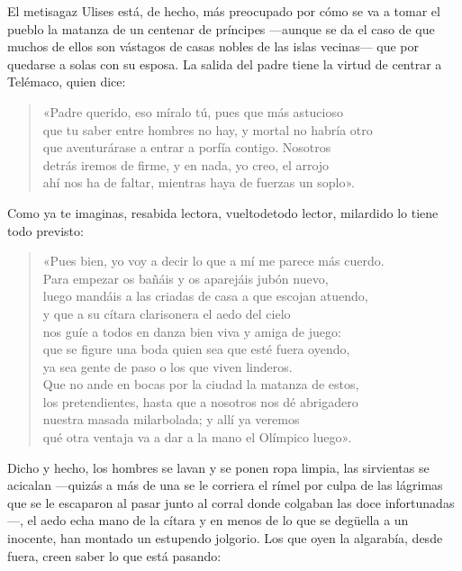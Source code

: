 El metisagaz Ulises está, de hecho, más preocupado por cómo se va a tomar el pueblo la matanza de un centenar de príncipes ---aunque se da el caso de que muchos de ellos son vástagos de casas nobles de las islas vecinas--- que por quedarse a solas con su esposa. La salida del padre tiene la virtud de centrar a Telémaco, quien dice:

\begin{verse}
«Padre querido, eso míralo tú, pues que más astucioso\\
que tu saber entre hombres no hay, y mortal no habría otro\\
que aventurárase a entrar a porfía contigo. Nosotros\\
detrás iremos de firme, y en nada, yo creo, el arrojo\\
ahí nos ha de faltar, mientras haya de fuerzas un soplo».
\end{verse}

Como ya te imaginas, resabida lectora, vueltodetodo lector, milardido lo tiene todo previsto:

\begin{verse}
«Pues bien, yo voy a decir lo que a mí me parece más cuerdo.\\
Para empezar os bañáis y os aparejáis jubón nuevo,\\
luego mandáis a las criadas de casa a que escojan atuendo,\\
y que a su cítara clarisonera el aedo del cielo\\
nos guíe a todos en danza bien viva y amiga de juego:\\
que se figure una boda quien sea que esté fuera oyendo,\\
ya sea gente de paso o los que viven linderos.\\
Que no ande en bocas por la ciudad la matanza de estos,\\
los pretendientes, hasta que a nosotros nos dé abrigadero\\
nuestra masada milarbolada; y allí ya veremos\\
qué otra ventaja va a dar a la mano el Olímpico luego».
\end{verse}

Dicho y hecho, los hombres se lavan y se ponen ropa limpia, las sirvientas se acicalan ---quizás a más de una se le corriera el rímel por culpa de las lágrimas que se le escaparon al pasar junto al corral donde colgaban las doce infortunadas---, el aedo echa mano de la cítara y en menos de lo que se degüella a un inocente, han montado un estupendo jolgorio. Los que oyen la algarabía, desde fuera, creen saber lo que está pasando:

